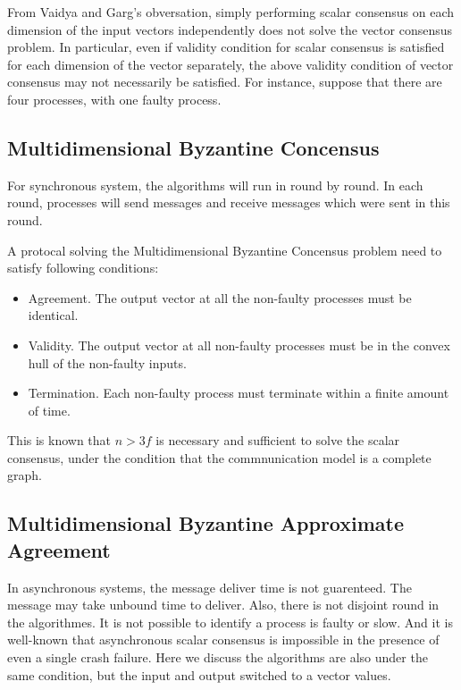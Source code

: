 From Vaidya and Garg's obversation, simply performing scalar consensus on
each dimension of the input vectors independently does not solve the vector consensus problem.
In particular, even if validity condition for scalar consensus is satisfied for each dimension of the
vector separately, the above validity condition of vector consensus may not necessarily be satisfied.
For instance, suppose that there are four processes, with one faulty process\cite{vaidya2013byzantine}.

\subsection{Multidimensional Byzantine Concensus}

For synchronous system, the algorithms will run in round by round. In each round, processes
will send messages and receive messages which were sent in this round.

A protocal solving the Multidimensional Byzantine Concensus problem need to satisfy following
conditions\cite{mendes2015multidimensional}:

\begin{itemize}
    \item Agreement. The output vector at all the non-faulty processes must be identical.

    \item Validity. The output vector at all non-faulty processes must be in the convex hull of
the non-faulty inputs.

    \item Termination. Each non-faulty process must terminate within a finite amount of time.

\end{itemize}

This is known that $n > 3f$ is necessary and sufficient to solve the scalar consensus, under the condition
that the commnunication model is a complete graph. 


\subsection{Multidimensional Byzantine Approximate Agreement}
In asynchronous systems, the message deliver time is not guarenteed. The message may take unbound time
to deliver. Also, there is not disjoint round in the algorithmes. It is not possible to identify a
process is faulty or slow\cite{attiya2004distributed}. And it is well-known that asynchronous scalar consensus
is impossible in the presence of even a single crash failure\cite{fischer1985impossibility}. Here we
discuss the algorithms are also under the same condition, but the input and output switched to a
vector values.

